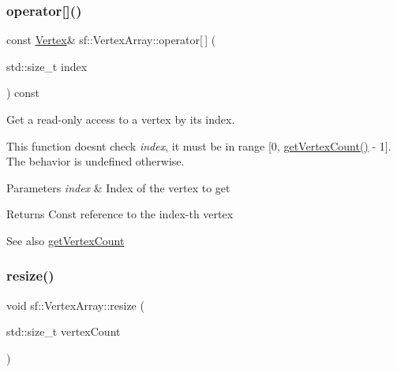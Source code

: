 \subsubsection{\texorpdfstring{operator[]()}{operator[]()}\hspace{0.1cm}{\footnotesize\ttfamily [2/2]}}
{\footnotesize\ttfamily const \mbox{\hyperlink{classsf_1_1_vertex}{Vertex}}\& sf\+::\+Vertex\+Array\+::operator\mbox{[}$\,$\mbox{]} (\begin{DoxyParamCaption}\item[{std\+::size\+\_\+t}]{index }\end{DoxyParamCaption}) const}



Get a read-\/only access to a vertex by its index. 

This function doesn\textquotesingle{}t check {\itshape index}, it must be in range \mbox{[}0, \mbox{\hyperlink{classsf_1_1_vertex_array_abda90e8d841a273d93164f0c0032bd8d}{get\+Vertex\+Count()}} -\/ 1\mbox{]}. The behavior is undefined otherwise.


\begin{DoxyParams}{Parameters}
{\em index} & Index of the vertex to get\\
\hline
\end{DoxyParams}
\begin{DoxyReturn}{Returns}
Const reference to the index-\/th vertex
\end{DoxyReturn}
\begin{DoxySeeAlso}{See also}
\mbox{\hyperlink{classsf_1_1_vertex_array_abda90e8d841a273d93164f0c0032bd8d}{get\+Vertex\+Count}} \begin{DoxyVerb}\end{DoxyVerb}
 
\end{DoxySeeAlso}
\mbox{\label{classsf_1_1_vertex_array_a0c0fe239e8f9a54e64d3bbc96bf548c0}} 
\subsubsection{\texorpdfstring{resize()}{resize()}}
{\footnotesize\ttfamily void sf\+::\+Vertex\+Array\+::resize (\begin{DoxyParamCaption}\item[{std\+::size\+\_\+t}]{vertex\+Count }\end{DoxyParamCaption})}



